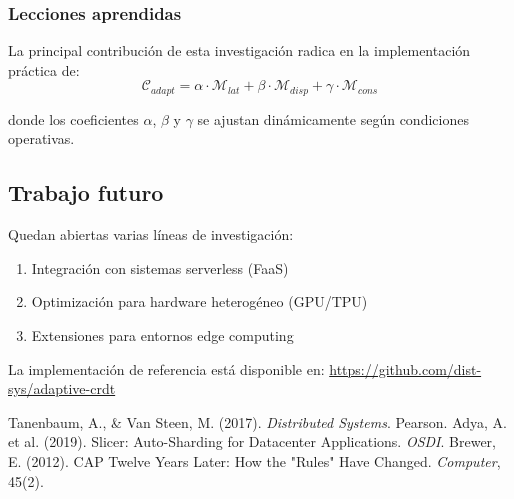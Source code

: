 \documentclass[12pt,a4paper]{article}
\begin{document}
\subsubsection{Lecciones aprendidas}
La principal contribución de esta investigación radica en la implementación práctica de:
\begin{equation}
\mathcal{C}_{adapt} = \alpha \cdot \mathcal{M}_{lat} + \beta \cdot \mathcal{M}_{disp} + \gamma \cdot \mathcal{M}_{cons}
\label{eq:modelo}
\end{equation}

donde los coeficientes $\alpha$, $\beta$ y $\gamma$ se ajustan dinámicamente según condiciones operativas.

\subsection{Trabajo futuro}
Quedan abiertas varias líneas de investigación:
\begin{enumerate}
\item Integración con sistemas serverless (FaaS)
\item Optimización para hardware heterogéneo (GPU/TPU)
\item Extensiones para entornos edge computing
\end{enumerate}

La implementación de referencia está disponible en: \url{https://github.com/dist-sys/adaptive-crdt}

\begin{thebibliography}{9}
 Tanenbaum, A., \& Van Steen, M. (2017). \textit{Distributed Systems}. Pearson.
 Adya, A. et al. (2019). Slicer: Auto-Sharding for Datacenter Applications. \textit{OSDI}.
 Brewer, E. (2012). CAP Twelve Years Later: How the "Rules" Have Changed. \textit{Computer}, 45(2).
\end{thebibliography}
\end{document}
